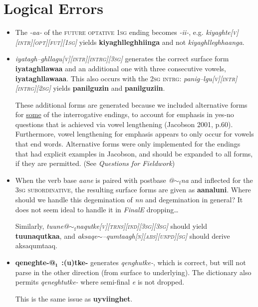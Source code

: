 \documentclass{article}
\begin{document}
\section{Logical Errors}
\begin{itemize}
\item The \textit{-aa-} of the \textsc{future optative 1sg} ending becomes \textit{-ii-}, e.g. \textit{kiyaghte\textsc{[v][intr][opt][fut][1sg]}} yields \textbf{kiyaghlleghhiinga} and not \textit{kiyaghlleghhaanga}.\label{fut-opt-1sg}

\item \textit{iyatagh--ghllagu\textsc{[v][intr][intrg][3sg]}} generates the correct surface form \textbf{iyataghllawaa} and an additional one with three consecutive vowels, \textbf{iyataghllawaaa}. This also occurs with the \textsc{2sg intrg}: \textit{panig--lgu\textsc{[v][intr][intrg][2sg]}} yields \textbf{panilguzin} and \textbf{panilguziin}.

These additional forms are generated because we included alternative forms for \underline{some} of the interrogative endings, to account for emphasis in yes-no questions that is achieved via vowel lengthening (Jacobson 2001, p.60). Furthermore, vowel lengthening for emphasis appears to only occur for vowels that end words. Alternative forms were only implemented for the endings that had explicit examples in Jacobson, and should be expanded to all forms, if they are permitted. (See \textit{Questions for Fieldwork})

\item When the verb base \textit{aane} is paired with postbase \textit{@$\sim_\text{f}$na} and inflected for the \textsc{3sg subordinative}, the resulting surface forms are given as \textbf{aanaluni}. Where should we handle this degemination of \textit{nn} and degemination in general? It does not seem ideal to handle it in \textit{FinalE} dropping\ldots

Similarly, \textit{tuune@$\sim_\text{f}$naqutke\textsc{[v][trns][ind][3sg][3sg]}} should yield \textbf{tuunaqutkaa}, and \textit{aksaqe$\sim$--qumtaagh\textsc{[n][abs][unpd][sg]}} should derive {aksaqumtaaq}.

\item \textbf{qeneghte-@₁~:(u)tke-} generates \textit{qenghutke-}, which is correct, but will not parse in the other direction (from surface to underlying). The dictionary also permits \textit{qeneghtutke-} where semi-final \textit{e} is not dropped.

This is the same issue as \textbf{uyviinghet}.
\end{itemize}
\end{document}

